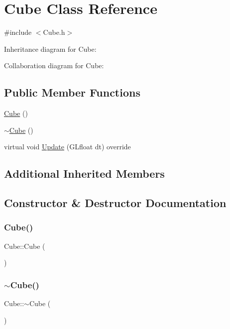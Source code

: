 \hypertarget{class_cube}{}\section{Cube Class Reference}
\label{class_cube}


{\ttfamily \#include $<$Cube.\+h$>$}



Inheritance diagram for Cube\+:


Collaboration diagram for Cube\+:
\subsection*{Public Member Functions}
\begin{DoxyCompactItemize}
\item 
\mbox{\hyperlink{class_cube_a06f3d86fb63e3aad08623610aa3c17b4}{Cube}} ()
\item 
\mbox{\hyperlink{class_cube_aa814e979cecb8c451fdb332ded2cea1e}{$\sim$\+Cube}} ()
\item 
virtual void \mbox{\hyperlink{class_cube_a52a6950310f4529d9a3df4bc60c0625b}{Update}} (G\+Lfloat dt) override
\end{DoxyCompactItemize}
\subsection*{Additional Inherited Members}


\subsection{Constructor \& Destructor Documentation}
\mbox{\label{class_cube_a06f3d86fb63e3aad08623610aa3c17b4}} 
\subsubsection{\texorpdfstring{Cube()}{Cube()}}
{\footnotesize\ttfamily Cube\+::\+Cube (\begin{DoxyParamCaption}{ }\end{DoxyParamCaption})}

\mbox{\label{class_cube_aa814e979cecb8c451fdb332ded2cea1e}} 
\subsubsection{\texorpdfstring{$\sim$Cube()}{~Cube()}}
{\footnotesize\ttfamily Cube\+::$\sim$\+Cube (\begin{DoxyParamCaption}{ }\end{DoxyParamCaption})}



